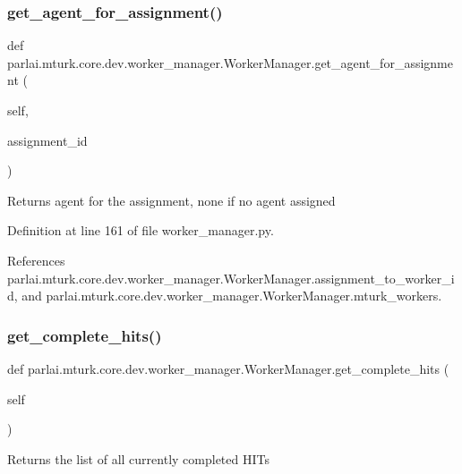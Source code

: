 \subsubsection{\texorpdfstring{get\+\_\+agent\+\_\+for\+\_\+assignment()}{get\_agent\_for\_assignment()}}
{\footnotesize\ttfamily def parlai.\+mturk.\+core.\+dev.\+worker\+\_\+manager.\+Worker\+Manager.\+get\+\_\+agent\+\_\+for\+\_\+assignment (\begin{DoxyParamCaption}\item[{}]{self,  }\item[{}]{assignment\+\_\+id }\end{DoxyParamCaption})}

\begin{DoxyVerb}Returns agent for the assignment, none if no agent assigned\end{DoxyVerb}
 

Definition at line 161 of file worker\+\_\+manager.\+py.



References parlai.\+mturk.\+core.\+dev.\+worker\+\_\+manager.\+Worker\+Manager.\+assignment\+\_\+to\+\_\+worker\+\_\+id, and parlai.\+mturk.\+core.\+dev.\+worker\+\_\+manager.\+Worker\+Manager.\+mturk\+\_\+workers.

\mbox{\label{classparlai_1_1mturk_1_1core_1_1dev_1_1worker__manager_1_1WorkerManager_a21d7624c63aa1e6540db8d551a1744d2}} 
\subsubsection{\texorpdfstring{get\+\_\+complete\+\_\+hits()}{get\_complete\_hits()}}
{\footnotesize\ttfamily def parlai.\+mturk.\+core.\+dev.\+worker\+\_\+manager.\+Worker\+Manager.\+get\+\_\+complete\+\_\+hits (\begin{DoxyParamCaption}\item[{}]{self }\end{DoxyParamCaption})}

\begin{DoxyVerb}Returns the list of all currently completed HITs\end{DoxyVerb}
 

